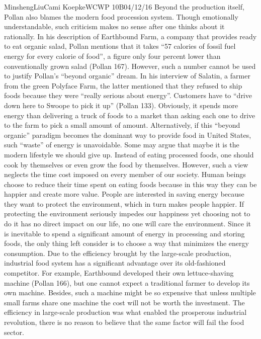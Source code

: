 \documentclass[12pt,letterpaper]{article}
\begin{document}
\begin{mla}{Minsheng}{Liu}{Cami Koepke}{WCWP 10B}{04/12/16}
Beyond the production itself, Pollan also blames the modern food
procession system. Though emotionally understandable, such criticism
makes no sense after one thinks about it rationally. In his description
of Earthbound Farm, a company that provides ready to eat organic salad,
Pollan mentions that it takes ``57 calories of fossil fuel energy for
every calorie of food'', a figure only four percent lower than
conventionally grown salad (Pollan 167). However, such a number cannot
be used to justify Pollan's ``beyond organic'' dream. In his interview
of Salatin, a farmer from the green Polyface Farm, the latter mentioned
that they refused to ship foods because they were ``really serious about
energy''. Customers have to ``drive down here to Swoope to pick it up''
(Pollan 133). Obviously, it spends more energy than delivering a truck
of foods to a market than asking each one to drive to the farm to pick a
small amount of amount. Alternatively, if this ``beyond organic''
paradigm becomes the dominant way to provide food in United States, such
``waste'' of energy is unavoidable. Some may argue that maybe it is the
modern lifestyle we should give up. Instead of eating processed foods,
one should cook by themselves or even grow the food by themselves.
However, such a view neglects the time cost imposed on every member of
our society. Human beings choose to reduce their time spent on eating
foods because in this way they can be happier and create more value.
People are interested in saving energy because they want to protect the
environment, which in turn makes people happier. If protecting the
environment seriously impedes our happiness yet choosing not to do it
has no direct impact on our life, no one will care the environment.
Since it is inevitable to spend a significant amount of energy in
processing and storing foods, the only thing left consider is to choose
a way that minimizes the energy consumption. Due to the efficiency
brought by the large-scale production, industrial food system has a
significant advantage over its old-fashioned competitor. For example,
Earthbound developed their own lettuce-shaving machine (Pollan 166), but
one cannot expect a traditional farmer to develop its own machine.
Besides, such a machine might be so expensive that unless multiple small
farms share one machine the cost will not be worth the investment. The
efficiency in large-scale production was what enabled the prosperous
industrial revolution, there is no reason to believe that the same
factor will fail the food sector.


\end{mla}
\end{document}
